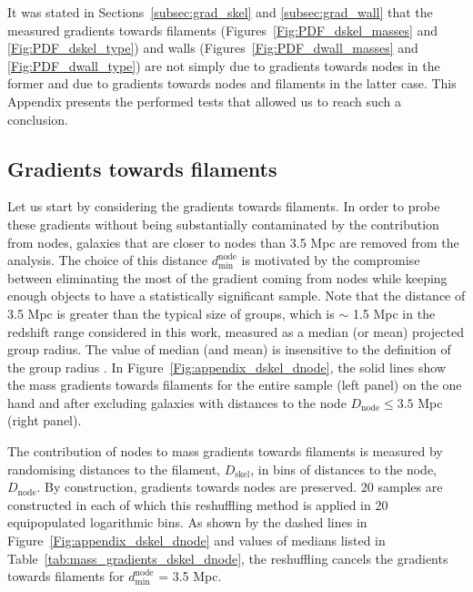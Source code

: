 \documentclass[useAMS,usenatbib]{mnras}
\begin{document}
It was stated in Sections~\ref{subsec:grad_skel} and \ref{subsec:grad_wall} that the measured gradients towards filaments (Figures~\ref{Fig:PDF_dskel_masses} and \ref{Fig:PDF_dskel_type}) and walls (Figures~\ref{Fig:PDF_dwall_masses} and \ref{Fig:PDF_dwall_type}) are not simply due to gradients towards nodes in the former and due to gradients towards nodes and filaments in the latter case. 
 This Appendix presents the performed tests that allowed us to reach such a conclusion. 

\subsection{Gradients towards filaments}
\label{subsec:appendix_filaments}


Let us start by considering the gradients towards filaments. In order to probe these gradients without being substantially contaminated by the contribution from nodes, galaxies that are closer to nodes than 3.5 Mpc are removed from the analysis. The choice of this distance $d^{\mathrm{node}}_{\mathrm{min}}$ is motivated by the compromise between eliminating the most of the gradient coming from nodes while keeping enough objects to have a statistically significant sample. 
Note that the distance of 3.5 Mpc is greater than the typical size of groups, which is $\sim$ 1.5 Mpc in the redshift range considered in this work, measured as a median (or mean) projected group radius.
The value of median (and mean) is insensitive to the definition of the group radius \citep[see][for various definitions considered]{Robotham2011}. 
In Figure~\ref{Fig:appendix_dskel_dnode}, the solid lines show the mass gradients towards filaments for the entire  sample (left panel) on the one hand and after excluding galaxies with distances to the node $D_{\mathrm{node}} \leq 3.5$ Mpc (right panel). 

The contribution of nodes to  mass gradients towards filaments is measured by randomising distances to the filament, $D_{\mathrm{skel}}$, in bins of distances to the node, $D_{\mathrm{node}}$. By construction,  gradients towards nodes are preserved.  
20 samples are constructed in each of which this reshuffling method is applied in 20 equipopulated logarithmic bins.  
As shown by the dashed lines in Figure~\ref{Fig:appendix_dskel_dnode} and values of medians listed in Table~\ref{tab:mass_gradients_dskel_dnode}, the reshuffling cancels the gradients towards filaments for $d^{\mathrm{node}}_{\mathrm{min}}$ = 3.5 Mpc.       
\end{document}
